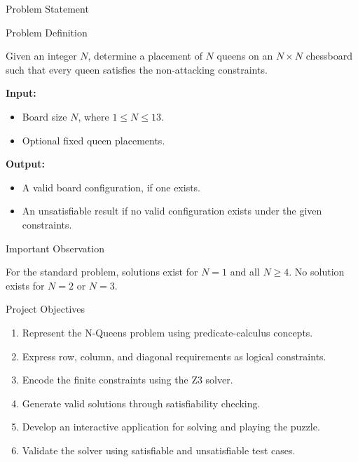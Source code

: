 \documentclass[aspectratio=169,12pt]{beamer}
\begin{document}
\begin{frame}{Problem Statement}

\begin{block}{Problem Definition}

Given an integer $N$, determine a placement of $N$ queens
on an $N \times N$ chessboard such that every queen
satisfies the non-attacking constraints.
\end{block}

\textbf{Input:}
\begin{itemize}
    \item Board size $N$, where $1 \leq N \leq 13$.
    \item Optional fixed queen placements.
\end{itemize}

\textbf{Output:}
\begin{itemize}
    \item A valid board configuration, if one exists.
    \item An unsatisfiable result if no valid configuration
          exists under the given constraints.
\end{itemize}

\begin{alertblock}{Important Observation}

For the standard problem, solutions exist for $N=1$ and
all $N \geq 4$. No solution exists for $N=2$ or $N=3$.
\end{alertblock}

\end{frame}


\begin{frame}{Project Objectives}

\begin{enumerate}
    \item Represent the N-Queens problem using
          predicate-calculus concepts.
    \item Express row, column, and diagonal requirements
          as logical constraints.
    \item Encode the finite constraints using the Z3 solver.
    \item Generate valid solutions through satisfiability
          checking.
    \item Develop an interactive application for solving
          and playing the puzzle.
    \item Validate the solver using satisfiable and
          unsatisfiable test cases.
\end{enumerate}

\end{frame}
\end{document}
